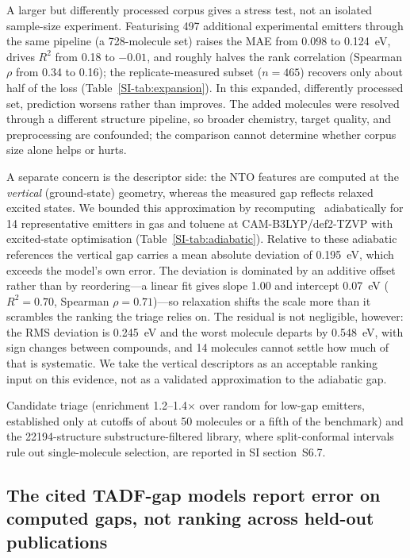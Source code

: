 A larger but differently processed corpus gives a stress test, not an isolated
sample-size experiment. Featurising \num{497} additional
experimental emitters through the same pipeline (a \num{728}-molecule set) raises
the MAE from \qty{0.098}{} to \qty{0.124}{\electronvolt}, drives $R^2$ from
\num{0.18} to $-0.01$, and roughly halves the rank correlation (Spearman $\rho$
from \num{0.34} to \num{0.16}); the replicate-measured subset
($n = \num{465}$) recovers only about half of the loss (Table~\ref{SI-tab:expansion}).
In this expanded, differently processed set, prediction worsens rather than
improves. The added molecules were resolved through a different structure
pipeline, so broader chemistry, target quality, and preprocessing are confounded;
the comparison cannot determine whether corpus size alone helps or hurts.

A separate concern is the descriptor side: the NTO features are computed at the
\emph{vertical} (ground-state) geometry, whereas the measured gap reflects relaxed
excited states. We bounded this approximation by recomputing \deltaest\ adiabatically
for \num{14} representative emitters in gas and toluene at CAM-B3LYP/def2-TZVP with
excited-state optimisation (Table~\ref{SI-tab:adiabatic}). Relative to these adiabatic
references the vertical gap carries a mean absolute deviation of
\qty{0.195}{\electronvolt}, which exceeds the model's own error. The deviation is
dominated by an additive offset rather than by reordering---a linear fit gives slope
\num{1.00} and intercept \qty{0.07}{\electronvolt} ($R^2 = 0.70$, Spearman
$\rho = 0.71$)---so relaxation shifts the scale more than it scrambles the ranking the
triage relies on. The residual is not negligible, however: the RMS deviation is
\qty{0.245}{\electronvolt} and the worst molecule departs by \qty{0.548}{\electronvolt},
with sign changes between compounds, and \num{14} molecules cannot settle how much of
that is systematic. We take the vertical descriptors as an acceptable ranking input on
this evidence, not as a validated approximation to the adiabatic gap.

Candidate triage (enrichment \num{1.2}--\num{1.4}$\times$ over random for low-gap emitters,
established only at cutoffs of about \num{50} molecules or a fifth of the benchmark) and the
\num{22194}-structure substructure-filtered library, where split-conformal intervals rule out
single-molecule selection, are reported in SI section~S6.7.

\subsection{The cited TADF-gap models report error on computed gaps, not ranking across held-out publications}\label{subsec:comparison}

